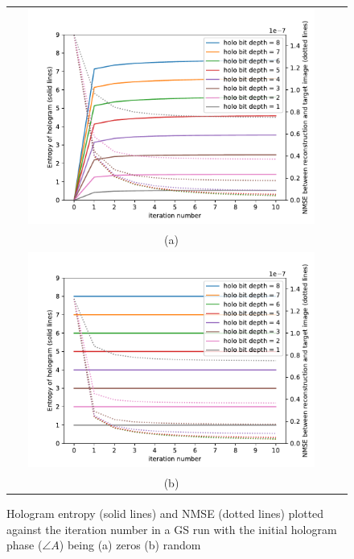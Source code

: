 	\begin{figure} [H]
		\begin{center}
			\begin{tabular}{c c}
				\includegraphics[trim={30 0 10 20}, clip, width = 0.9\textwidth]{GS_Fresnel0.1_iterations_zero_start.pdf}\vspace{-5mm} \\
				(a)\\ \vspace{-2mm}
				\includegraphics[trim={30 0 10 20}, clip, width = 0.9\textwidth]{GS_Fresnel0.1_iterations_random_start.pdf}\vspace{-4mm} \\
				(b) \vspace{-2mm}
			\end{tabular}
			\caption{\label{fig:GS_Fresnel0.1_iterations} Hologram entropy (solid lines) and NMSE (dotted lines) plotted against the iteration number in a GS run with the initial hologram phase ($\angle A$) being (a) zeros (b) random}
		\end{center}
	\end{figure}


